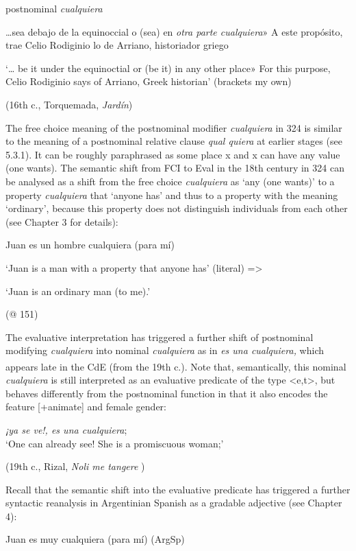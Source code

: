   postnominal \textit{cualquiera}

  …sea debajo de la equinoccial o (sea) en \textit{otra parte cualquiera}» A este propósito, trae Celio Rodiginio lo de Arriano, historiador griego

  ‘… be it under the equinoctial or (be it) in any other place» For this purpose, Celio Rodiginio says of Arriano, Greek historian’ (brackets my own)

  (16th c., Torquemada, \textit{Jardín})

The free choice meaning of the postnominal modifier \textit{cualquiera} in 324 is similar to the meaning of a postnominal relative clause \textit{qual quiera} at earlier stages (see 5.3.1). It can be roughly paraphrased as some place x and x can have any value (one wants). The semantic shift from FCI to Eval in the 18th century in 324 can be analysed as a shift from the free choice \textit{cualquiera} as ‘any (one wants)’ to a property \textit{cualquiera} that ‘anyone has’ and thus to a property with the meaning ‘ordinary’, because this property does not distinguish individuals from each other (see Chapter 3 for details): 

  Juan es un hombre cualquiera (para mí)

  ‘Juan is a man with a property that anyone has’ (literal) =>

‘Juan is an ordinary man (to me).’

  (@ 151)

The evaluative interpretation has triggered a further shift of postnominal modifying \textit{cualquiera} into nominal \textit{cualquiera} as in \textit{es una cualquiera,} which appears late in the CdE (from the 19th\textsuperscript{} c.). Note that, semantically, this nominal \textit{cualquiera} is still interpreted as an evaluative predicate of the type <e,t>, but behaves differently from the postnominal function in that it also encodes the feature [+animate] and female gender:

  \textit{¡ya se ve!, es una cualquiera};\\
‘One can already see! She is a promiscuous woman;’ 

  (19th c., Rizal, \textit{Noli me tangere} )

Recall that the semantic shift into the evaluative predicate has triggered a further syntactic reanalysis in Argentinian Spanish as a gradable adjective (see Chapter 4):

  Juan es muy cualquiera (para mí)  (ArgSp)

